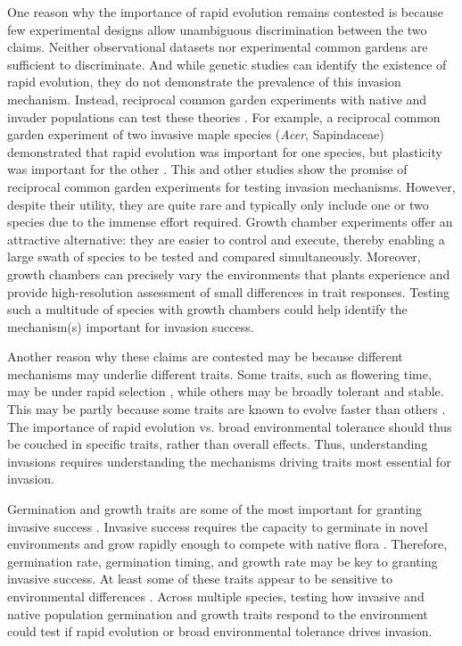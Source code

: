 \documentclass[12pt]{article}\usepackage[]{graphicx}\usepackage[]{color}
\begin{document}
	
	One reason why the importance of rapid evolution remains contested is because few experimental designs allow unambiguous discrimination between the two claims. Neither observational datasets \parencite[e.g.,][]{Wolkovich2013} nor experimental common gardens \parencite{Conner2004,Vitasse2009} are sufficient to discriminate. And while genetic studies can identify the existence of rapid evolution, they do not demonstrate the prevalence of this invasion mechanism. Instead, reciprocal common garden experiments with native and invader populations can test these theories \parencite[e.g.,][]{Lamarque2015,Williams2008}. For example, a reciprocal common garden experiment of two invasive maple species (\textit{Acer}, Sapindaceae) demonstrated that rapid evolution was important for one species, but plasticity was important for the other \parencite{Lamarque2015}.  This and other studies show the promise of reciprocal common garden experiments for testing invasion mechanisms. However, despite their utility, they are quite rare and typically only include one or two species due to the immense effort required. Growth chamber experiments offer an attractive alternative: they are easier to control and execute, thereby enabling a large swath of species to be tested and compared simultaneously. Moreover, growth chambers can precisely vary the environments that plants experience and provide high-resolution assessment of small differences in trait responses. Testing such a multitude of species with growth chambers could help identify the mechanism(s) important for invasion success.  
	
	Another reason why these claims are contested may be because different mechanisms may underlie different traits. Some traits, such as flowering time, may be under rapid selection \parencite{Weber1998}, while others may be broadly tolerant and stable. This may be partly because some traits are known to evolve faster than others \parencite{Weiss-Lehman2017}. The importance of rapid evolution vs. broad environmental tolerance should thus be couched in specific traits, rather than overall effects. Thus,  understanding invasions requires understanding the mechanisms driving traits most essential for invasion.
	
	Germination and growth traits are some of the most important for granting invasive success \parencite{Sattin1997, Maillet2000}. Invasive success requires the capacity to germinate in novel environments and grow rapidly enough to compete with native flora \parencite{Grime1988}. Therefore, germination rate, germination timing, and growth rate may be key to granting invasive success. At least some of these traits appear to be sensitive to environmental differences \parencite{Leger2007}.  Across multiple species, testing how invasive and native population germination and growth traits respond to the environment could test if rapid evolution or broad environmental tolerance drives invasion. 
\end{document}
